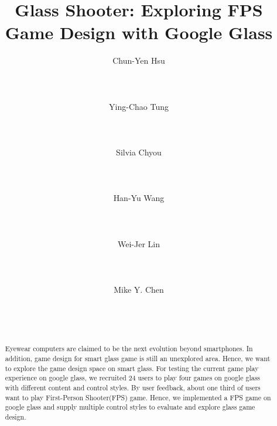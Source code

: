 \documentclass{sigchi}
\begin{document}
\title{Glass Shooter: Exploring FPS Game Design with Google Glass}

\author{
  \alignauthor Chun-Yen Hsu\\
    \\
    \\
    \\
  \alignauthor Ying-Chao Tung\\
    \\
    \\
    \\
  \alignauthor Silvia Chyou\\
    \\
    \\
    \\
  \alignauthor Han-Yu Wang\\
    \\
    \\
    \\
  \alignauthor Wei-Jer Lin\\
    \\
    \\
    \\
  \alignauthor Mike Y. Chen\\
    \\
    \\
    \\    
}

\maketitle



\begin{abstract}
Eyewear computers are claimed to be the next evolution beyond smartphones. In addition, game design for smart glass game is still an unexplored area. Hence, we want to explore the game design space on smart glass. For testing the current game play experience on google glass, we recruited 24 users to play four games on google glass with different content and control styles. By user feedback, about one third of users want to play First-Person Shooter(FPS) game. Hence, we implemented a FPS game on google glass and supply multiple control styles to evaluate and explore glass game design.
\end{abstract}
\end{document}
